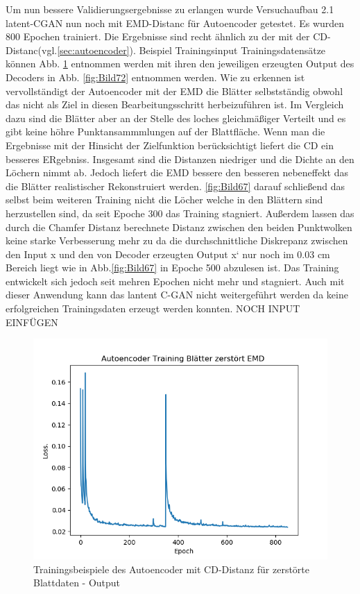 \documentclass{llncs}
\begin{document}
Um nun bessere Validierungsergebnisse zu erlangen wurde Versuchaufbau 2.1 latent-CGAN nun noch mit EMD-Distanc für Autoencoder getestet. Es wurden 800 Epochen trainiert. Die Ergebnisse sind recht ähnlich zu der mit der CD-Distanc(vgl.\ref{sec:autoencoder}). Beispiel Trainingsinput Trainingsdatensätze können  Abb. \ref{fig:Bild71} entnommen werden mit ihren den jeweiligen erzeugten Output des Decoders in Abb. \ref{fig:Bild72} entnommen werden. 
Wie zu erkennen ist vervollständigt der Autoencoder mit der EMD die Blätter selbstständig obwohl das nicht als Ziel in diesen Bearbeitungsschritt herbeizuführen ist. Im Vergleich dazu sind die Blätter aber an der Stelle des loches gleichmäßiger Verteilt und es gibt keine höhre Punktansammmlungen auf der Blattfläche. Wenn man die Ergebnisse mit der Hinsicht der Zielfunktion berücksichtigt liefert die CD ein besseres ERgebniss. Insgesamt sind die Distanzen niedriger und die Dichte an den Löchern nimmt ab. Jedoch liefert die EMD bessere den besseren nebeneffekt das die Blätter realistischer Rekonstruiert werden. \ref{fig:Bild67} darauf schließend das selbst beim weiteren Training nicht die Löcher welche in den Blättern sind herzustellen sind, da seit Epoche 300 das Training stagniert. Außerdem lassen das durch die Chamfer Distanz berechnete Distanz zwischen den beiden Punktwolken keine starke Verbesserung mehr zu da die durchschnittliche Diskrepanz zwischen den Input x und den von Decoder erzeugten Output x` nur noch im 0.03 cm Bereich liegt wie in Abb.\ref{fig:Bild67} in Epoche 500 abzulesen ist. Das Training entwickelt sich jedoch seit mehren Epochen nicht mehr und stagniert. Auch mit dieser Anwendung kann das lantent C-GAN nicht weitergeführt werden da keine erfolgreichen Trainingsdaten erzeugt werden konnten.
NOCH INPUT EINFÜGEN
\begin{figure}[htbp] 
	\centering
	\includegraphics[width=1.0\textwidth]{autoencoder_training_bleatter_zer_result_emd.png}
	\caption{Trainingsbeispiele des Autoencoder mit CD-Distanz für zerstörte Blattdaten - Output}
	\label{fig:Bild71}
\end{figure}
\end{document}
